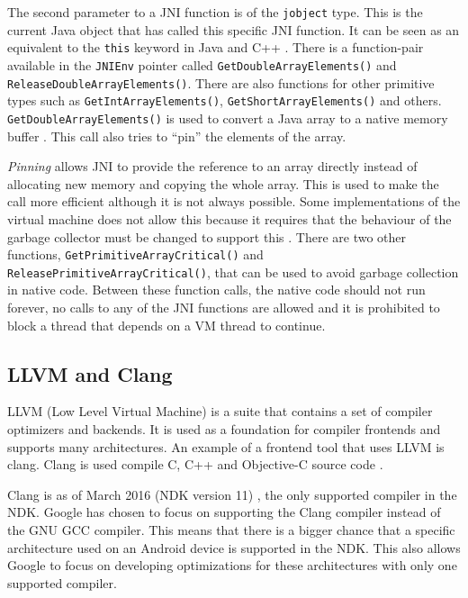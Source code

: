 The second parameter to a JNI function is of the \texttt{jobject} type. This is the current Java object that has called this specific JNI function. It can be seen as an equivalent to the \texttt{this} keyword in Java and C++ \cite[p.~23]{liang1999java}. There is a function-pair available in the \texttt{JNIEnv} pointer called \texttt{GetDoubleArrayElements()} and \texttt{ReleaseDoubleArrayElements()}. There are also functions for other primitive types such as \texttt{GetIntArrayElements()}, \texttt{GetShortArrayElements()} and others. \texttt{GetDoubleArrayElements()} is used to convert a Java array to a native memory buffer \cite[p.~159]{liang1999java}. This call also tries to \enquote{pin} the elements of the array.

\emph{Pinning} allows JNI to provide the reference to an array directly instead of allocating new memory and copying the whole array. This is used to make the call more efficient although it is not always possible. Some implementations of the virtual machine does not allow this because it requires that the behaviour of the garbage collector must be changed to support this \cite[p.~158]{liang1999java}. There are two other functions, \texttt{GetPrimitiveArrayCritical()} and \texttt{ReleasePrimitiveArrayCritical()}, that can be used to avoid garbage collection in native code. Between these function calls, the native code should not run forever, no calls to any of the JNI functions are allowed and it is prohibited to block a thread that depends on a VM thread to continue.


\subsection{LLVM and Clang}
LLVM (Low Level Virtual Machine) is a suite that contains a set of compiler optimizers and backends. It is used as a foundation for compiler frontends and supports many architectures. An example of a frontend tool that uses LLVM is \gls{clang}. Clang is used compile C, C++ and Objective-C source code \cite{clang:comp}.

Clang is as of March 2016 (NDK version 11) \cite{android:ndk:revision}, the only supported compiler in the NDK. Google has chosen to focus on supporting the Clang compiler instead of the GNU GCC compiler. This means that there is a bigger chance that a specific architecture used on an Android device is supported in the NDK. This also allows Google to focus on developing optimizations for these architectures with only one supported compiler.


